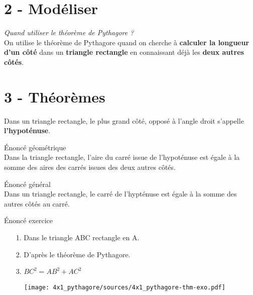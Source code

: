 \documentclass[11pt]{article}
\begin{document}
\section*{2 - Modéliser}

\textit{Quand utiliser le théorème de Pythagore ?}\\

On utilise le théorème de Pythagore quand on cherche à \textbf{calculer la longueur d'un côté} dans un \textbf{triangle rectangle} en connaissant déjà les \textbf{deux autres côtés}.



\section*{3 - Théorèmes}

\begin{Definition}
Dans un triangle rectangle, le plus grand côté, opposé à l'angle droit s'appelle \textbf{l'hypoténuse}.
\end{Definition}



\begin{Theorem}{Énoncé géométrique}\\
Dans la triangle rectangle, l'aire du carré issue de l'hypoténuse est égale à la somme des aires des carrés issues des deux autres côtés.
\end{Theorem}

\begin{Theorem}{Énoncé général}\\
Dans un triangle rectangle, le carré de l'hypténuse est égale à la somme des autres côtés au carré.
\end{Theorem}

\begin{Theorem}{Énoncé exercice}\\
    \begin{enumerate}
        \item[1.] Dans le triangle ABC rectangle en A.
        \item[2.] D'après le théorème de Pythagore.
        \item[3.] $BC^2 = AB^2 + AC^2$
    \end{enumerate}
    
    \begin{figure}[H]
        \centering
        \texttt{[image: 4x1\_pythagore/sources/4x1\_pythagore-thm-exo.pdf]}
    \end{figure}
\end{Theorem}
\end{document}

